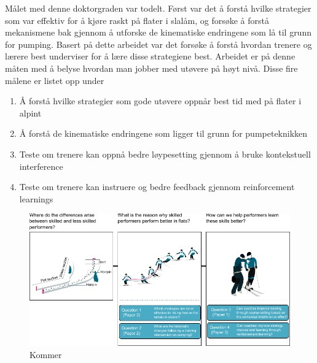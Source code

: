 Målet med denne doktorgraden var todelt. Først var det å forstå hvilke strategier som var effektiv for å kjøre raskt på flater i slalåm, og forsøke å forstå mekanismene bak gjennom å utforske de kinematiske endringene som lå til grunn for pumping. Basert på dette arbeidet var det forsøke å forstå hvordan trenere og lærere best underviser for å lære disse strategiene best. Arbeidet er på denne måten med å belyse hvordan man jobber med utøvere på høyt nivå. Disse fire målene er listet opp under

\begin{enumerate}
    \item Å forstå hvilke strategier som gode utøvere oppnår best tid med på flater i alpint
    \item Å forstå de kinematiske endringene som ligger til grunn for pumpeteknikken
    \item Teste om trenere kan oppnå bedre løypesetting gjennom å bruke kontekstuell interference
    \item Teste om trenere kan instruere og bedre feedback gjennom reinforcement learnings
\end{enumerate}

\begin{figure}[H]
\centering
\includegraphics{figure_overview_3.pdf}
\caption{Kommer}
\label{fig:energy}
\end{figure}

